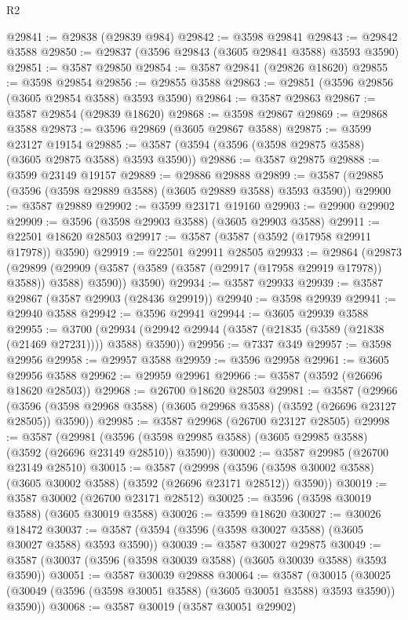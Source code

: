 \begin{lexlean}{R2}
\begin{coremodule}
@29841 := @29838 (@29839 @984)
@29842 := @3598 @29841
@29843 := @29842 @3588
@29850 := @29837 (@3596 @29843 (@3605 @29841 @3588) @3593 @3590)
@29851 := @3587 @29850
@29854 := @3587 @29841 (@29826 @18620)
@29855 := @3598 @29854
@29856 := @29855 @3588
@29863 := @29851 (@3596 @29856 (@3605 @29854 @3588) @3593 @3590)
@29864 := @3587 @29863
@29867 := @3587 @29854 (@29839 @18620)
@29868 := @3598 @29867
@29869 := @29868 @3588
@29873 := @3596 @29869 (@3605 @29867 @3588)
@29875 := @3599 @23127 @19154
@29885 := @3587 (@3594 (@3596 (@3598 @29875 @3588) (@3605 @29875 @3588) @3593 @3590))
@29886 := @3587 @29875
@29888 := @3599 @23149 @19157
@29889 := @29886 @29888
@29899 := @3587 (@29885 (@3596 (@3598 @29889 @3588) (@3605 @29889 @3588) @3593 @3590))
@29900 := @3587 @29889
@29902 := @3599 @23171 @19160
@29903 := @29900 @29902
@29909 := @3596 (@3598 @29903 @3588) (@3605 @29903 @3588)
@29911 := @22501 @18620 @28503
@29917 := @3587 (@3587 (@3592 (@17958 @29911 @17978)) @3590)
@29919 := @22501 @29911 @28505
@29933 := @29864
    (@29873
      (@29899 (@29909 (@3587 (@3589 (@3587 (@29917 (@17958 @29919 @17978)) @3588)) @3588) @3590))
      @3590)
@29934 := @3587 @29933
@29939 := @3587 @29867 (@3587 @29903 (@28436 @29919))
@29940 := @3598 @29939
@29941 := @29940 @3588
@29942 := @3596 @29941
@29944 := @3605 @29939 @3588
@29955 := @3700
    (@29934 (@29942 @29944 (@3587 (@21835 (@3589 (@21838 (@21469 @27231)))) @3588) @3590))
@29956 := @7337 @349
@29957 := @3598 @29956
@29958 := @29957 @3588
@29959 := @3596 @29958
@29961 := @3605 @29956 @3588
@29962 := @29959 @29961
@29966 := @3587 (@3592 (@26696 @18620 @28503))
@29968 := @26700 @18620 @28503
@29981 := @3587
    (@29966 (@3596 (@3598 @29968 @3588) (@3605 @29968 @3588) (@3592 (@26696 @23127 @28505)) @3590))
@29985 := @3587 @29968 (@26700 @23127 @28505)
@29998 := @3587
    (@29981 (@3596 (@3598 @29985 @3588) (@3605 @29985 @3588) (@3592 (@26696 @23149 @28510)) @3590))
@30002 := @3587 @29985 (@26700 @23149 @28510)
@30015 := @3587
    (@29998 (@3596 (@3598 @30002 @3588) (@3605 @30002 @3588) (@3592 (@26696 @23171 @28512)) @3590))
@30019 := @3587 @30002 (@26700 @23171 @28512)
@30025 := @3596 (@3598 @30019 @3588) (@3605 @30019 @3588)
@30026 := @3599 @18620
@30027 := @30026 @18472
@30037 := @3587 (@3594 (@3596 (@3598 @30027 @3588) (@3605 @30027 @3588) @3593 @3590))
@30039 := @3587 @30027 @29875
@30049 := @3587 (@30037 (@3596 (@3598 @30039 @3588) (@3605 @30039 @3588) @3593 @3590))
@30051 := @3587 @30039 @29888
@30064 := @3587
    (@30015 (@30025 (@30049 (@3596 (@3598 @30051 @3588) (@3605 @30051 @3588) @3593 @3590)) @3590))
@30068 := @3587 @30019 (@3587 @30051 @29902)

\end{coremodule}
\end{lexlean}
